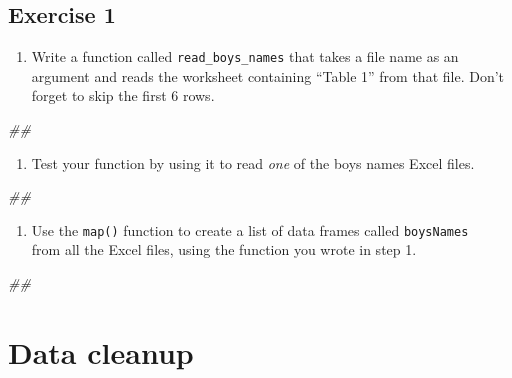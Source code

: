 \documentclass[
]{book}
\newenvironment{Shaded}{\begin{snugshade}}{\end{snugshade}}
\newcommand{\CommentTok}[1]{\textcolor[rgb]{0.56,0.35,0.01}{\textit{#1}}}
\providecommand{\tightlist}{%
  \setlength{\itemsep}{0pt}\setlength{\parskip}{0pt}}
\begin{document}
\hypertarget{exercise-1-3}{%
\subsection{Exercise 1}\label{exercise-1-3}}

\begin{enumerate}
\def\labelenumi{\arabic{enumi}.}
\tightlist
\item
  Write a function called \texttt{read\_boys\_names} that takes a file name as an argument
  and reads the worksheet containing ``Table 1'' from that file. Don't forget
  to skip the first 6 rows.
\end{enumerate}

\begin{Shaded}
\begin{Highlighting}[]
\CommentTok{## }
\end{Highlighting}
\end{Shaded}

\begin{enumerate}
\def\labelenumi{\arabic{enumi}.}
\setcounter{enumi}{1}
\tightlist
\item
  Test your function by using it to read \emph{one} of the boys names
  Excel files.
\end{enumerate}

\begin{Shaded}
\begin{Highlighting}[]
\CommentTok{## }
\end{Highlighting}
\end{Shaded}

\begin{enumerate}
\def\labelenumi{\arabic{enumi}.}
\setcounter{enumi}{2}
\tightlist
\item
  Use the \texttt{map()} function to create a list of data frames called \texttt{boysNames}\\
  from all the Excel files, using the function you wrote in step 1.
\end{enumerate}

\begin{Shaded}
\begin{Highlighting}[]
\CommentTok{## }
\end{Highlighting}
\end{Shaded}

\hypertarget{data-cleanup}{%
\section{Data cleanup}\label{data-cleanup}}
\end{document}
